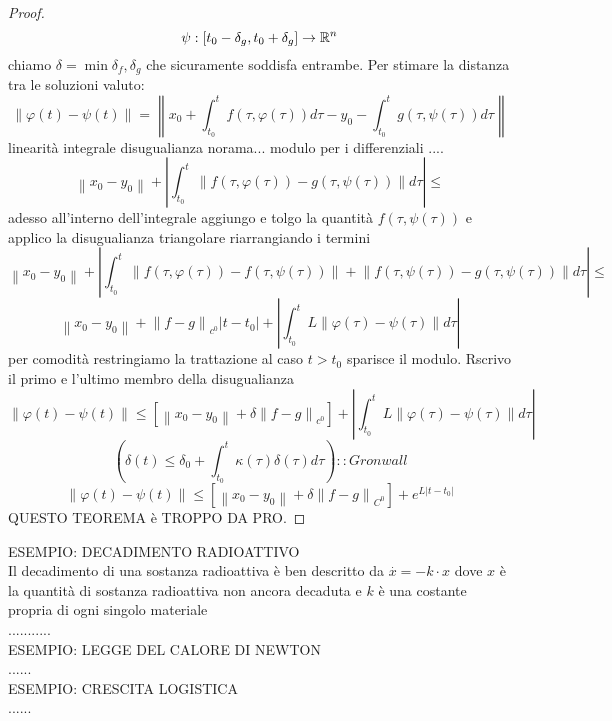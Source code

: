 \begin{proof}
	$$\psi:\left[t_0-\delta_g,t_0+\delta_g\right]\to \mathbb{R}^n$$
	chiamo $\delta=\min{\delta_f,\delta_g}$ che sicuramente soddisfa entrambe. Per stimare la distanza tra le soluzioni valuto:
	$$
	\left\|\varphi(t)-\psi(t)\right\|=
	\left\|  x_0+\int_{t_0}^t f(\tau,\varphi(\tau))d\tau - y_0 - \int_{t_0}^t g(\tau,\psi(\tau))d\tau\right\|
	$$
	linearità integrale disugualianza norama... modulo per i differenziali ....\\
	$$ \left\| x_0-y_0\right\|+\left| \int_{t_0}^{t} \left\| f(\tau,\varphi(\tau))-g(\tau,\psi(\tau)) \right\|d\tau \right|\le$$
	adesso all'interno dell'integrale aggiungo e tolgo la quantità $f(\tau,\psi(\tau))$ e applico la disugualianza triangolare riarrangiando i termini
	$$ \left\| x_0-y_0\right\|+\left| \int_{t_0}^{t} \left\| f(\tau,\varphi(\tau))-f(\tau,\psi(\tau))\right\|+\left\|f(\tau,\psi(\tau))-g(\tau,\psi(\tau)) \right\|d\tau \right|\le$$
	$$ \left\| x_0-y_0\right\| + \left\| f-g\right\|_{c^0}\left|t-t_0\right| +\left| \int_{t_0}^{t} L\left\|\varphi(\tau)-\psi(\tau)\right\| d\tau \right|$$
	per comodità restringiamo la trattazione al caso $t>t_0$ sparisce il modulo. Rscrivo il primo e l'ultimo membro della disugualianza
	$$ \left\|\varphi(t)-\psi(t)\right\|\le  \left[ \left\| x_0-y_0\right\| + \delta\left\| f-g\right\|_{c^0}\right] +\left| \int_{t_0}^{t} L\left\|\varphi(\tau)-\psi(\tau)\right\| d\tau \right|$$
	$$ \left( \delta(t)\le\delta_0+\int_{t_0}^t \kappa(\tau)\delta(\tau)d\tau \right)::Gronwall$$
	$$ \left\| \varphi(t)-\psi(t)\right\|\le\left[\left\|x_0-y_0\right\|+\delta\left\|f-g\right\|_{C^0}\right]+e^{L\left|t-t_0\right|}$$
	QUESTO TEOREMA è TROPPO DA PRO.
\end{proof}
ESEMPIO: DECADIMENTO RADIOATTIVO\\
Il decadimento di una sostanza radioattiva è ben descritto da $\overset{\cdot}{x}=-k\cdot x$ dove $x$ è la quantità di sostanza radioattiva non ancora decaduta e $k$ è una costante propria di ogni singolo materiale\\
...........\\
ESEMPIO: LEGGE DEL CALORE DI NEWTON\\
......\\
ESEMPIO: CRESCITA LOGISTICA\\
......\\
